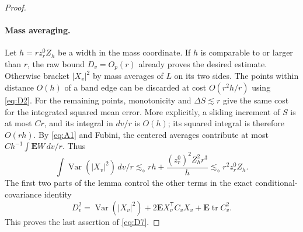 \begin{proof}
\paragraph{Mass averaging.}
Let $h=rz_r^0Z_h$ be a width in the mass coordinate.  If $h$
is comparable to or larger than $r$, the raw bound $D_v=O_p(r)$ already
proves the desired estimate.  Otherwise bracket $|X_v|^2$ by mass
averages of $L$ on its two sides.  The points within distance $O(h)$
of a band edge can be discarded at cost $O(r^2h/r)$ using
\eqref{eq:D2}.  For the remaining points, monotonicity and
$\Delta S\lesssim r$ give the same cost for the integrated squared
mean error.  More explicitly, a sliding increment of $S$ is at most
$Cr$, and its integral in $dv/r$ is $O(h)$; its squared integral is
therefore $O(rh)$.  By \eqref{eq:A1} and Fubini, the centered averages
contribute at most $C h^{-1}\int\mathbf EW\,dv/r$.  Thus
\[
 \int\operatorname{Var}(|X_v|^2)\,dv/r
 \lesssim_\diamond r h+
       \frac{(z_r^0)^2Z_h^2r^3}{h}
 \lesssim_\diamond r^2z_r^0Z_h.
\]
The first two parts of the lemma control the other terms in the exact
conditional-covariance identity
\[
 D_v^2=\operatorname{Var}(|X_v|^2)
          +2\mathbf EX_v^{\mathsf T}C_vX_v
          +\mathbf E\operatorname{tr}C_v^2.
\]
This proves the last assertion of \eqref{eq:D7}.

\end{proof}

